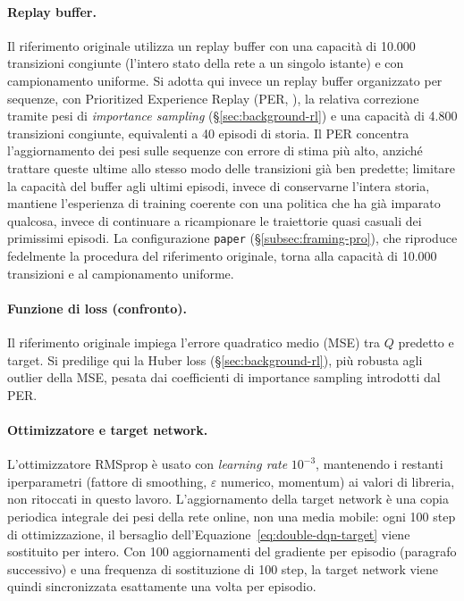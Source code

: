 \paragraph{Replay buffer.} Il riferimento originale utilizza un replay
buffer con una capacità di 10.000 transizioni congiunte (l'intero stato
della rete a un singolo istante) e con campionamento uniforme. Si adotta
qui invece un replay buffer organizzato per sequenze, con Prioritized
Experience Replay (PER, \citealp{schaul2016per}), la relativa correzione
tramite pesi di \emph{importance sampling} (§\ref{sec:background-rl}) e
una capacità di 4.800 transizioni congiunte, equivalenti a 40 episodi di
storia. Il PER concentra l'aggiornamento dei pesi sulle sequenze con
errore di stima più alto, anziché trattare queste ultime allo stesso modo
delle transizioni già ben predette; limitare la capacità del buffer agli
ultimi episodi, invece di conservarne l'intera storia, mantiene
l'esperienza di training coerente con una politica che ha già imparato
qualcosa, invece di continuare a ricampionare le traiettorie quasi
casuali dei primissimi episodi. La configurazione \texttt{paper}
(§\ref{subsec:framing-pro}), che riproduce fedelmente la procedura del
riferimento originale, torna alla capacità di 10.000 transizioni e al
campionamento uniforme.

\paragraph{Funzione di loss (confronto).} Il riferimento originale impiega
l'errore quadratico medio (MSE) tra $Q$ predetto e target. Si predilige
qui la Huber loss (§\ref{sec:background-rl}), più robusta agli outlier
della MSE, pesata dai coefficienti di importance sampling introdotti dal
PER.

\paragraph{Ottimizzatore e target network.} L'ottimizzatore RMSprop è
usato con \emph{learning rate} $10^{-3}$, mantenendo i restanti
iperparametri (fattore di smoothing, $\varepsilon$ numerico, momentum) ai
valori di libreria, non ritoccati in questo lavoro. L'aggiornamento della
target network è una copia periodica integrale dei pesi della rete
online, non una media mobile: ogni 100 step di ottimizzazione, il
bersaglio dell'Equazione~\ref{eq:double-dqn-target} viene sostituito per
intero. Con 100 aggiornamenti del gradiente per episodio
(paragrafo successivo) e una frequenza di sostituzione di 100 step, la
target network viene quindi sincronizzata esattamente una volta per
episodio.

